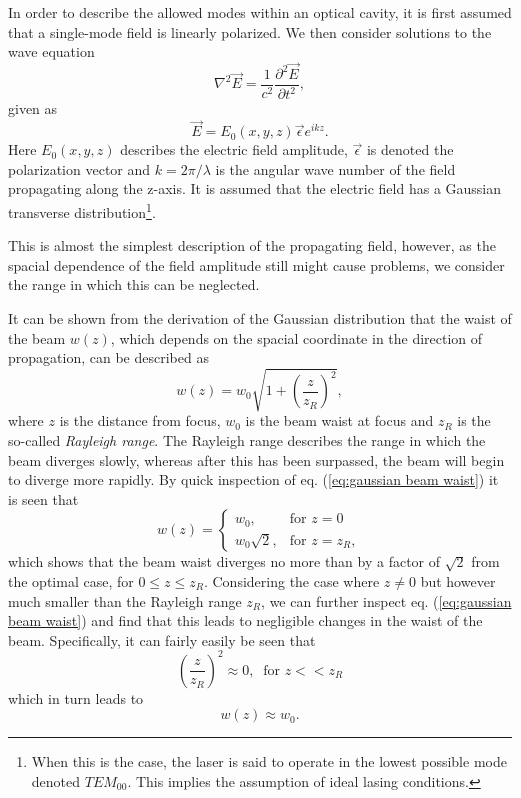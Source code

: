 In order to describe the allowed modes within an optical cavity, it is first assumed that a single-mode field is linearly polarized. We then consider solutions to the wave equation
\begin{equation}
    \nabla^2 \vec{E} = \frac{1}{c^2} \frac{\partial^2 \vec{E}}{\partial t^2},
\end{equation}
given as
\begin{equation}
    \vec{E} = E_0 (x,y,z) \vec{\epsilon} e^{i k z}. 
\end{equation}
Here $E_0(x,y,z)$ describes the electric field amplitude, $\vec{\epsilon}$ is denoted the polarization vector and $k=2 \pi / \lambda$ is the angular wave number of the field propagating along the z-axis. It is assumed that the electric field has a Gaussian transverse distribution\footnote{When this is the case, the laser is said to operate in the lowest possible mode denoted $TEM_{00}$. This implies the assumption of ideal lasing conditions.}.

This is almost the simplest description of the propagating field, however, as the spacial dependence of the field amplitude still might cause problems, we consider the range in which this can be neglected. 

It can be shown from the derivation of the Gaussian distribution that the waist of the beam $w(z)$, which depends on the spacial coordinate in the direction of propagation, can be described as \cite{Eichhorn}
\begin{equation}
    w(z) = w_0 \sqrt{1 + \left(\frac{z}{z_R}\right)^2},
    \label{eq:gaussian beam waist}
\end{equation}
where $z$ is the distance from focus, $w_0$ is the beam waist at focus and $z_R$ is the so-called \emph{Rayleigh range}. The Rayleigh range describes the range in which the beam diverges slowly, whereas after this has been surpassed, the beam will begin to diverge more rapidly. By quick inspection of eq. (\ref{eq:gaussian beam waist}) it is seen that
\begin{equation}
    w(z) = 
    \begin{cases}
        w_0, & \mbox{for } z=0 \\
        w_0\sqrt{2}, & \mbox{for } z=z_R,
    \end{cases}
\end{equation}
which shows that the beam waist diverges no more than by a factor of $\sqrt{2}$ from the optimal case, for $0\leq z \leq z_R$. Considering the case where $z \neq 0$ but however much smaller than the Rayleigh range $z_R$, we can further inspect eq. (\ref{eq:gaussian beam waist}) and find that this leads to negligible changes in the waist of the beam. Specifically, it can fairly easily be seen that
\begin{equation}
    \left(\frac{z}{z_R}\right)^2 \approx 0, \: \text{  for } z << z_R
\end{equation}
which in turn leads to 
\begin{equation}
    w(z) \approx w_0.
\end{equation}

